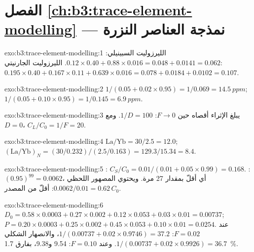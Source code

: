 \section*{الفصل \ref{ch:b3:trace-element-modelling} --- نمذجة العناصر النزرة}

\begin{solution}{exo:b3:trace-element-modelling:1}
الليرزوليت السبينيلي: $0.12\times0.40 + 0.88\times0.016 = 0.048 + 0.0141 =
0.062$. الليرزوليت الجارنيتي: $0.195\times0.40 + 0.167\times0.11 +
0.639\times0.016 = 0.078 + 0.0184 + 0.0102 = 0.107$.
\end{solution}

\begin{solution}{exo:b3:trace-element-modelling:2}
$1/(0.05 + 0.02\times0.95) = 1/0.069 = \qty{14.5}{ppm}$;
$1/(0.05 + 0.10\times0.95) = 1/0.145 = \qty{6.9}{ppm}$.
\end{solution}

\begin{solution}{exo:b3:trace-element-modelling:3}
يبلغ الإثراء أقصاه حين $F \to 0$: $1/D = 100$. ومع $D = 0$،
$C_L/C_0 = 1/F = 20$.
\end{solution}

\begin{solution}{exo:b3:trace-element-modelling:4}
$\mathrm{La/Yb} = 30/2.5 = 12.0$; $(\mathrm{La}/\mathrm{Yb})_N =
(30/0.232)/(2.5/0.163) = 129.3/15.34 = 8.4$.
\end{solution}

\begin{solution}{exo:b3:trace-element-modelling:5}
: $C_S/C_0 = 0.01/(0.01 + 0.05\times0.99) = 0.168$. :
$(0.95)^{99} = 0.0062$، أي أقلّ بمقدار 27 مرة. ويحتوي المصهور اللحظي
$0.0062/0.01 = 0.62\,C_0$: أقلّ من المصدر.
\end{solution}

\begin{solution}{exo:b3:trace-element-modelling:6}
$D_0 = 0.58\times0.0003 + 0.27\times0.002 + 0.12\times0.053 + 0.03\times0.01
= 0.00737$; $P = 0.20\times0.0003 + 0.25\times0.002 + 0.45\times0.053 +
0.10\times0.01 = 0.0254$. عند $F = 0.02$:  $1/(0.00737 +
0.02\times0.9746) = 37.2$، والانصهار الشكلي $1/(0.00737 + 0.02\times0.9926) = 36.7$. وعند
$F = 0.10$: 9.54 و9.38، بفارق \qty{1.7}{\percent}.
\end{solution}

